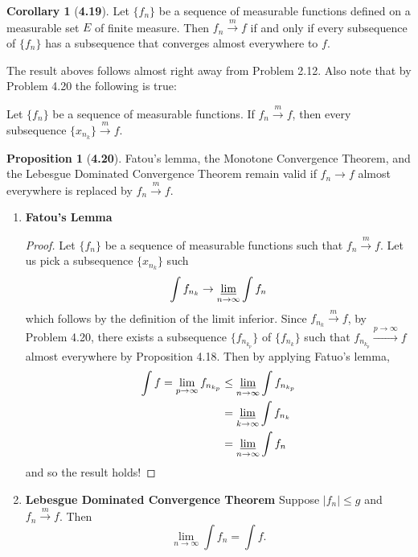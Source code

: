 \documentclass[12pt]{article}
\newcommand{\toM}{\overset{m}{\to}}
\theoremstyle{definition}
\newtheorem*{cor}{Corollary}
\newtheorem*{prop}{Proposition}
\begin{document}
\begin{cor}[\textbf{4.19}]

    Let \( \{f_n\} \) be a sequence of measurable functions defined on a measurable set \( E \) of finite measure. Then \( {f_n} \toM  f \) if and only if every subsequence of \( \{f_n\} \) has a subsequence that converges almost everywhere to \( f \).
    
\end{cor}

The result aboves follows almost right away from Problem 2.12. Also note that by Problem 4.20 the following is true:

    Let \( \{f_n\} \) be a sequence of measurable functions. 
    If \( f_n \toM f \), then every subsequence \( \{x_{n_{k}}\} \toM f \).

\begin{prop}[\textbf{4.20}]

    Fatou's lemma, the Monotone Convergence Theorem, and the Lebesgue Dominated Convergence Theorem remain valid 
    if \( f_n \to f \) almost everywhere is replaced by \( f_n \toM f \).

    \begin{enumerate}[label = (\arabic{*})]
        \item \textbf{Fatou's Lemma}
            \begin{proof}
            Let \( \{f_n\} \) be a sequence of measurable functions such that \( f_n \toM f \). 
            Let us pick a subsequence \( \{x_{n_{k}} \} \) such 
                    \[
                        \int f_{n_{k}} \to \varliminf_{n \to \infty} \int f_{n}
                    \]
                which follows by the definition of the limit inferior.  
                Since \(  f_{n_{k}} \toM f \), by Problem 4.20, there exists a subsequence \( \{ f_{n_{k_{p}}}\}\) of \( \{f_{n_{k}}\}\) such that \( f_{n_{k_{p}}} \overset{p \to \infty}{\to} f \) almost everywhere by Proposition 4.18. Then by applying Fatuo's lemma,
                    \begin{align*}
                        \int f = \lim_{p \to \infty} f_{n_{k_{p}}} & \leq \varliminf_{n \to \infty} \int f_{n_{k_{p}}} \\
                        &= \varliminf_{k \to \infty} \int f_{n_{k}} \\
                        &= \varliminf_{n \to \infty} \int f_{n}
                    \end{align*}
                and so the result holds!
            \end{proof}
        \item \textbf{Lebesgue Dominated Convergence Theorem} Suppose \( |f_n| \leq g \) and \( f_n \toM f \). Then 
            \[
              \lim_{n \to \infty} \int f_n = \int f.   
            \]
        

\end{enumerate}
\end{prop}
\end{document}
